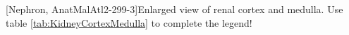 	\begin{minipage}[b]{7cm}
	   [Nephron, AnatMalAtl2-299-3]{Enlarged view of renal cortex and medulla. Use table \ref{tab:KidneyCortexMedulla} to complete the legend!}  	\label{fig:KidneyCortexMedulla}
	\vspace{2pt}
	\end{minipage}
	
\enlargethispage{1.2cm}
	
	
